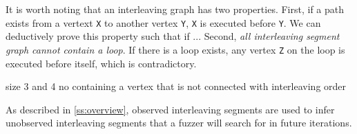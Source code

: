 It is worth noting that an interleaving graph has two
properties. First, if a path exists from a vertext \texttt{X} to
another vertex \texttt{Y}, \texttt{X} is executed before \texttt{Y}.
%
We can deductively prove this property such that if \dr{}...
%
Second, \textit{all interleaving segment graph cannot contain a loop}.
%
If there is a loop exists, any vertex \texttt{Z} on the loop is
executed before itself, which is contradictory.


%



%
size 3 and 4
%
no containing a vertex that is not connected with interleaving order


%
As described in \autoref{ss:overview}, observed interleaving segments
are used to infer unobserved interleaving segments that a fuzzer will
search for in future iterations.
%



